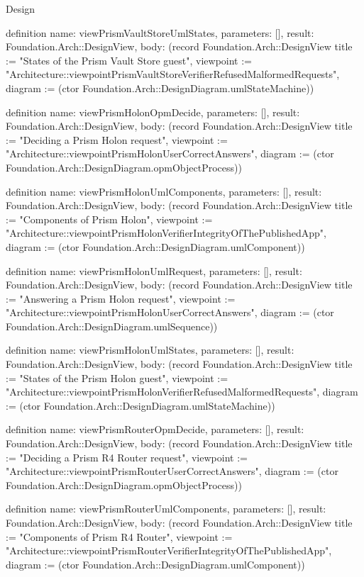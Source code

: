 \begin{lexlean}{Design}
\begin{semanticmodule}
definition{
  name: viewPrismVaultStoreUmlStates,
  parameters: [],
  result: Foundation.Arch::DesignView,
  body: (record Foundation.Arch::DesignView {title := "States of the Prism Vault Store guest", viewpoint := "Architecture::viewpointPrismVaultStoreVerifierRefusedMalformedRequests", diagram := (ctor Foundation.Arch::DesignDiagram.umlStateMachine)})
}

definition{
  name: viewPrismHolonOpmDecide,
  parameters: [],
  result: Foundation.Arch::DesignView,
  body: (record Foundation.Arch::DesignView {title := "Deciding a Prism Holon request", viewpoint := "Architecture::viewpointPrismHolonUserCorrectAnswers", diagram := (ctor Foundation.Arch::DesignDiagram.opmObjectProcess)})
}

definition{
  name: viewPrismHolonUmlComponents,
  parameters: [],
  result: Foundation.Arch::DesignView,
  body: (record Foundation.Arch::DesignView {title := "Components of Prism Holon", viewpoint := "Architecture::viewpointPrismHolonVerifierIntegrityOfThePublishedApp", diagram := (ctor Foundation.Arch::DesignDiagram.umlComponent)})
}

definition{
  name: viewPrismHolonUmlRequest,
  parameters: [],
  result: Foundation.Arch::DesignView,
  body: (record Foundation.Arch::DesignView {title := "Answering a Prism Holon request", viewpoint := "Architecture::viewpointPrismHolonUserCorrectAnswers", diagram := (ctor Foundation.Arch::DesignDiagram.umlSequence)})
}

definition{
  name: viewPrismHolonUmlStates,
  parameters: [],
  result: Foundation.Arch::DesignView,
  body: (record Foundation.Arch::DesignView {title := "States of the Prism Holon guest", viewpoint := "Architecture::viewpointPrismHolonVerifierRefusedMalformedRequests", diagram := (ctor Foundation.Arch::DesignDiagram.umlStateMachine)})
}

definition{
  name: viewPrismRouterOpmDecide,
  parameters: [],
  result: Foundation.Arch::DesignView,
  body: (record Foundation.Arch::DesignView {title := "Deciding a Prism R4 Router request", viewpoint := "Architecture::viewpointPrismRouterUserCorrectAnswers", diagram := (ctor Foundation.Arch::DesignDiagram.opmObjectProcess)})
}

definition{
  name: viewPrismRouterUmlComponents,
  parameters: [],
  result: Foundation.Arch::DesignView,
  body: (record Foundation.Arch::DesignView {title := "Components of Prism R4 Router", viewpoint := "Architecture::viewpointPrismRouterVerifierIntegrityOfThePublishedApp", diagram := (ctor Foundation.Arch::DesignDiagram.umlComponent)})
}


\end{semanticmodule}
\end{lexlean}
